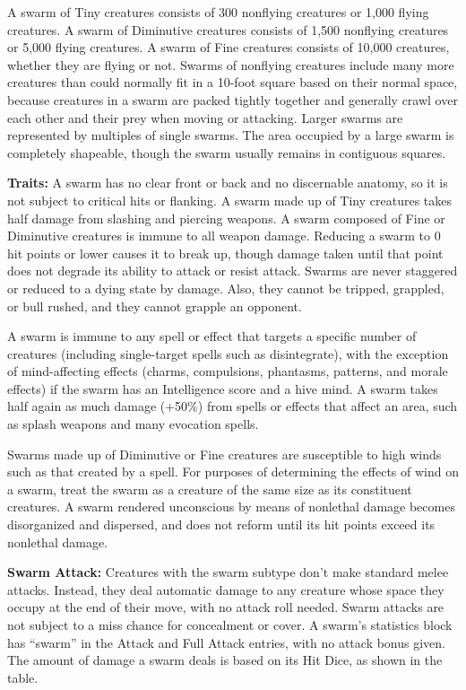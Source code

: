 A swarm of Tiny creatures consists of 300 nonflying creatures or 1,000 flying creatures. A swarm of Diminutive creatures consists of 1,500 nonflying creatures or 5,000 flying creatures. A swarm of Fine creatures consists of 10,000 creatures, whether they are flying or not. Swarms of nonflying creatures include many more creatures than could normally fit in a 10-foot square based on their normal space, because creatures in a swarm are packed tightly together and generally crawl over each other and their prey when moving or attacking. Larger swarms are represented by multiples of single swarms. The area occupied by a large swarm is completely shapeable, though the swarm usually remains in contiguous squares.

\textbf{Traits:} A swarm has no clear front or back and no discernable anatomy, so it is not subject to critical hits or flanking. A swarm made up of Tiny creatures takes half damage from slashing and piercing weapons. A swarm composed of Fine or Diminutive creatures is immune to all weapon damage. Reducing a swarm to 0 hit points or lower causes it to break up, though damage taken until that point does not degrade its ability to attack or resist attack. Swarms are never staggered or reduced to a dying state by damage. Also, they cannot be tripped, grappled, or bull rushed, and they cannot grapple an opponent.

A swarm is immune to any spell or effect that targets a specific number of creatures (including single-target spells such as disintegrate), with the exception of mind-affecting effects (charms, compulsions, phantasms, patterns, and morale effects) if the swarm has an Intelligence score and a hive mind. A swarm takes half again as much damage (+50\%) from spells or effects that affect an area, such as splash weapons and many evocation spells.

Swarms made up of Diminutive or Fine creatures are susceptible to high winds such as that created by a  spell. For purposes of determining the effects of wind on a swarm, treat the swarm as a creature of the same size as its constituent creatures. A swarm rendered unconscious by means of nonlethal damage becomes disorganized and dispersed, and does not reform until its hit points exceed its nonlethal damage.

\textbf{Swarm Attack:} Creatures with the swarm subtype don't make standard melee attacks. Instead, they deal automatic damage to any creature whose space they occupy at the end of their move, with no attack roll needed. Swarm attacks are not subject to a miss chance for concealment or cover. A swarm's statistics block has ``swarm'' in the Attack and Full Attack entries, with no attack bonus given. The amount of damage a swarm deals is based on its Hit Dice, as shown in the table.

